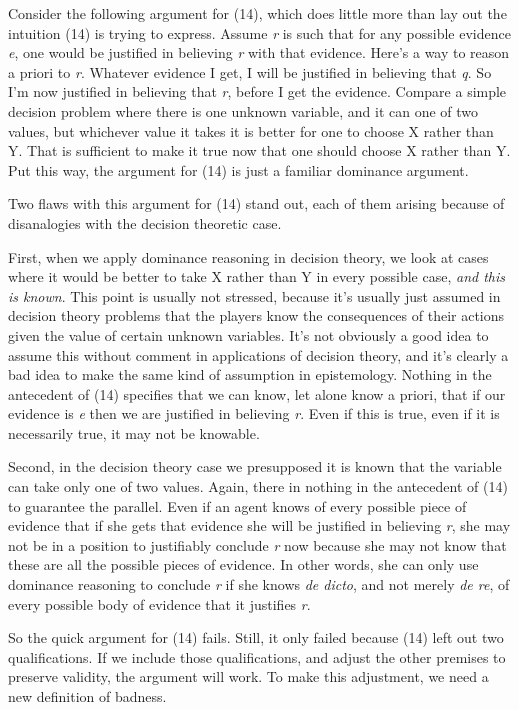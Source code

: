 \documentclass[
  11pt,
  letterpaper,
  DIV=11,
  numbers=noendperiod,
  oneside]{scrartcl}
\begin{document}
Consider the following argument for (14), which does little more than
lay out the intuition (14) is trying to express. Assume \emph{r} is such
that for any possible evidence \emph{e}, one would be justified in
believing \emph{r} with that evidence. Here's a way to reason a priori
to \emph{r}. Whatever evidence I get, I will be justified in believing
that \emph{q}. So I'm now justified in believing that \emph{r}, before I
get the evidence. Compare a simple decision problem where there is one
unknown variable, and it can one of two values, but whichever value it
takes it is better for one to choose X rather than Y. That is sufficient
to make it true now that one should choose X rather than Y. Put this
way, the argument for (14) is just a familiar dominance argument.

Two flaws with this argument for (14) stand out, each of them arising
because of disanalogies with the decision theoretic case.

First, when we apply dominance reasoning in decision theory, we look at
cases where it would be better to take X rather than Y in every possible
case, \emph{and this is known}. This point is usually not stressed,
because it's usually just assumed in decision theory problems that the
players know the consequences of their actions given the value of
certain unknown variables. It's not obviously a good idea to assume this
without comment in applications of decision theory, and it's clearly a
bad idea to make the same kind of assumption in epistemology. Nothing in
the antecedent of (14) specifies that we can know, let alone know a
priori, that if our evidence is \emph{e} then we are justified in
believing \emph{r}. Even if this is true, even if it is necessarily
true, it may not be knowable.

Second, in the decision theory case we presupposed it is known that the
variable can take only one of two values. Again, there in nothing in the
antecedent of (14) to guarantee the parallel. Even if an agent knows of
every possible piece of evidence that if she gets that evidence she will
be justified in believing \emph{r}, she may not be in a position to
justifiably conclude \emph{r} now because she may not know that these
are all the possible pieces of evidence. In other words, she can only
use dominance reasoning to conclude \emph{r} if she knows \emph{de
dicto}, and not merely \emph{de re}, of every possible body of evidence
that it justifies \emph{r}.

So the quick argument for (14) fails. Still, it only failed because (14)
left out two qualifications. If we include those qualifications, and
adjust the other premises to preserve validity, the argument will work.
To make this adjustment, we need a new definition of badness.
\end{document}
